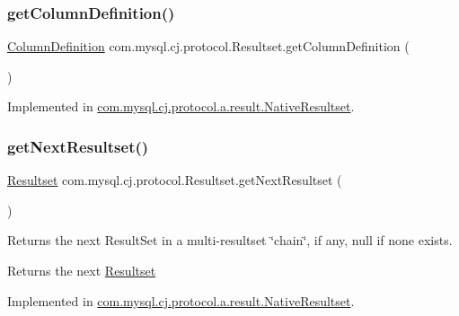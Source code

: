\subsubsection{\texorpdfstring{get\+Column\+Definition()}{getColumnDefinition()}}
{\footnotesize\ttfamily \mbox{\hyperlink{interfacecom_1_1mysql_1_1cj_1_1protocol_1_1_column_definition}{Column\+Definition}} com.\+mysql.\+cj.\+protocol.\+Resultset.\+get\+Column\+Definition (\begin{DoxyParamCaption}{ }\end{DoxyParamCaption})}



Implemented in \mbox{\hyperlink{classcom_1_1mysql_1_1cj_1_1protocol_1_1a_1_1result_1_1_native_resultset_a46cbcef39f6907dc5aa12d6f1353cf32}{com.\+mysql.\+cj.\+protocol.\+a.\+result.\+Native\+Resultset}}.

\mbox{\label{interfacecom_1_1mysql_1_1cj_1_1protocol_1_1_resultset_aeb71f17cb0bbc2c33b47bc7e6a1f750c}} 
\subsubsection{\texorpdfstring{get\+Next\+Resultset()}{getNextResultset()}}
{\footnotesize\ttfamily \mbox{\hyperlink{interfacecom_1_1mysql_1_1cj_1_1protocol_1_1_resultset}{Resultset}} com.\+mysql.\+cj.\+protocol.\+Resultset.\+get\+Next\+Resultset (\begin{DoxyParamCaption}{ }\end{DoxyParamCaption})}

Returns the next Result\+Set in a multi-\/resultset \char`\"{}chain\char`\"{}, if any, null if none exists.

\begin{DoxyReturn}{Returns}
the next \mbox{\hyperlink{interfacecom_1_1mysql_1_1cj_1_1protocol_1_1_resultset}{Resultset}} 
\end{DoxyReturn}


Implemented in \mbox{\hyperlink{classcom_1_1mysql_1_1cj_1_1protocol_1_1a_1_1result_1_1_native_resultset_a62322ab9154b99ce2ee8c0aca9b90faa}{com.\+mysql.\+cj.\+protocol.\+a.\+result.\+Native\+Resultset}}.

